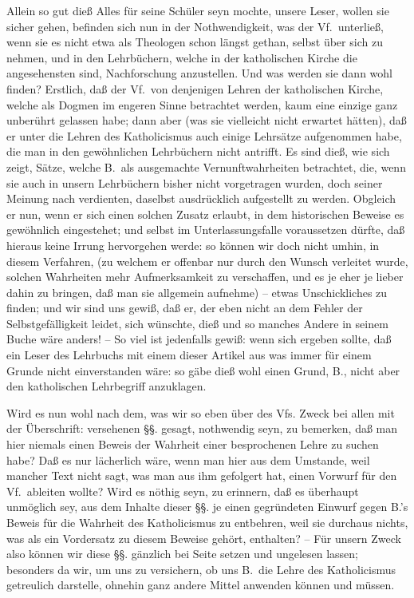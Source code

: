 Allein so gut dieß Alles für seine Schüler seyn mochte, unsere Leser, wollen sie sicher gehen, befinden sich nun in der Nothwendigkeit, was der Vf.\ unterließ, wenn sie es nicht etwa als Theologen schon längst gethan, selbst über sich zu nehmen, und in den Lehrbüchern, welche in der katholischen Kirche die angesehensten sind, Nachforschung anzustellen. Und was werden sie dann wohl finden? Erstlich, daß der Vf.\ von denjenigen Lehren der katholischen Kirche, welche als Dogmen im engeren Sinne betrachtet werden, kaum eine einzige ganz unberührt gelassen habe; dann aber (was sie vielleicht nicht erwartet hätten), daß er unter die Lehren des Katholicismus auch einige Lehrsätze aufgenommen habe, die man in den gewöhnlichen Lehrbüchern nicht antrifft. Es sind dieß, wie sich zeigt, Sätze, welche B.\ als ausgemachte Vernunftwahrheiten betrachtet, die, wenn sie auch in unsern Lehrbüchern bisher nicht vorgetragen wurden, doch seiner Meinung nach verdienten, daselbst ausdrücklich aufgestellt zu werden. Obgleich er nun, wenn er sich einen solchen Zusatz erlaubt, in dem historischen Beweise es gewöhnlich eingestehet; und selbst im Unterlassungsfalle voraussetzen dürfte, daß hieraus keine Irrung hervorgehen werde: so können wir doch nicht umhin, in diesem Verfahren, (zu welchem er offenbar nur durch den Wunsch verleitet wurde, solchen Wahrheiten mehr Aufmerksamkeit zu verschaffen, und es je eher je lieber dahin zu bringen, daß man sie allgemein aufnehme) -- etwas  Unschickliches zu finden; und wir sind uns gewiß, daß er, der eben nicht an dem Fehler der Selbstgefälligkeit leidet, sich wünschte, dieß und so manches Andere in seinem Buche wäre anders! -- So viel ist jedenfalls gewiß: wenn sich ergeben sollte, daß ein Leser des Lehrbuchs mit einem dieser Artikel aus was immer für einem Grunde nicht einverstanden wäre: so gäbe dieß wohl einen Grund, B., nicht aber den katholischen Lehrbegriff anzuklagen. \par
Wird es nun wohl nach dem, was wir so eben über des Vfs. Zweck bei allen mit der Überschrift:  versehenen §§. gesagt, nothwendig seyn, zu bemerken, daß man hier niemals einen Beweis der Wahrheit einer besprochenen Lehre zu suchen habe? Daß es nur lächerlich wäre, wenn man hier aus dem Umstande, weil mancher Text nicht sagt, was man aus ihm gefolgert hat, einen Vorwurf für den Vf.\ ableiten wollte? Wird es nöthig seyn, zu erinnern, daß es überhaupt unmöglich sey, aus dem Inhalte dieser §§. je einen gegründeten Einwurf gegen B.'s Beweis für die Wahrheit des Katholicismus zu entbehren, weil sie durchaus nichts, was als ein Vordersatz zu diesem Beweise gehört, enthalten? -- Für unsern Zweck also können wir diese §§. gänzlich bei Seite setzen und ungelesen lassen; besonders da wir, um uns zu versichern, ob uns B.\ die Lehre des Katholicismus getreulich darstelle, ohnehin ganz andere Mittel anwenden können und müssen. \par
